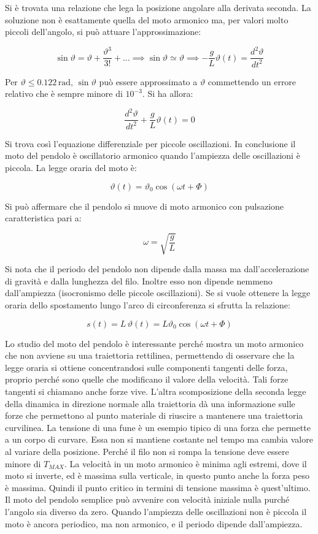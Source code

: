 Si è trovata una relazione che lega la posizione angolare alla derivata seconda. La soluzione non è esattamente quella del moto armonico ma, per valori molto piccoli dell'angolo, si può attuare l'approssimazione:

\[
	\sin\vartheta=\vartheta+\frac{\vartheta^3}{3!}+\dots \implies \sin\vartheta \simeq \vartheta \implies -\frac{g}{L}\vartheta(t)=\frac{d^2\vartheta}{dt^2}
\]

Per $\vartheta \le 0.122 \,\text{rad}, \,\sin\vartheta$ può essere approssimato a $\vartheta$ commettendo un errore relativo che è sempre minore di $10^{-3}$. Si ha allora:

\begin{equation}
	\frac{d^2\vartheta}{dt^2}+\frac{g}{L}\vartheta(t)=0
\end{equation}

Si trova così l'equazione differenziale per piccole oscillazioni. In conclusione il moto del pendolo è oscillatorio armonico quando l'ampiezza delle oscillazioni è piccola. La legge oraria del moto è:

\[
	\vartheta(t)=\vartheta_0\cos(\omega t+\Phi)
\]

Si può affermare che il pendolo si muove di moto armonico con pulsazione caratteristica pari a:

\[
	\omega=\sqrt{\frac{g}{L}}
\]

Si nota che il periodo del pendolo non dipende dalla massa ma dall'accelerazione di gravità e dalla lunghezza del filo. Inoltre esso non dipende nemmeno dall'ampiezza (isocronismo delle piccole oscillazioni).
Se si vuole ottenere la legge oraria dello spostamento lungo l'arco di circonferenza si sfrutta la relazione:

\[
	s(t)=L\,\vartheta(t)=L\vartheta_0\cos(\omega t+\Phi)
\]

Lo studio del moto del pendolo è interessante perché mostra un moto armonico che non avviene su una traiettoria rettilinea, permettendo di osservare che la legge oraria si ottiene concentrandosi sulle componenti tangenti delle forza, proprio perché sono quelle che modificano il valore della velocità. Tali forze tangenti si chiamano anche forze vive. L'altra scomposizione della seconda legge della dinamica in direzione normale alla traiettoria dà una informazione sulle forze che permettono al punto materiale di riuscire a mantenere una traiettoria curvilinea. La tensione di una fune è un esempio tipico di una forza che permette a un corpo di curvare. Essa non si mantiene costante nel tempo ma cambia valore al variare della posizione. Perché il filo non si rompa la tensione deve essere minore di $T_{MAX}$. La velocità in un moto armonico è minima agli estremi, dove il moto si inverte, ed è massima sulla verticale, in questo punto anche la forza peso è massima. Quindi il punto critico in termini di tensione massima è quest'ultimo.
Il moto del pendolo semplice può avvenire con velocità iniziale nulla purché l'angolo sia diverso da zero. Quando l'ampiezza delle oscillazioni non è piccola il moto è ancora periodico, ma non armonico, e il periodo dipende dall'ampiezza.

